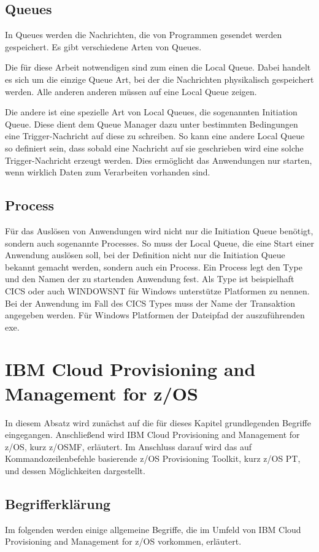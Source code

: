 \subsection{Queues}
In Queues werden die Nachrichten, die von Programmen gesendet werden gespeichert.
Es gibt verschiedene Arten von Queues.

Die für diese Arbeit notwendigen sind zum einen die Local Queue.
Dabei handelt es sich um die einzige Queue Art, bei der die Nachrichten physikalisch gespeichert werden.
Alle anderen anderen müssen auf eine Local Queue zeigen.

Die andere ist eine spezielle Art von Local Queues, die sogenannten Initiation Queue.
Diese dient dem Queue Manager dazu unter bestimmten Bedingungen eine Trigger-Nachricht auf diese zu schreiben.
So kann eine andere Local Queue so definiert sein, dass sobald eine Nachricht auf sie geschrieben wird eine solche Trigger-Nachricht erzeugt werden.
Dies ermöglicht das Anwendungen nur starten, wenn wirklich Daten zum Verarbeiten vorhanden sind.
\cite{Aranha.2013}

\subsection{Process}
Für das Auslösen von Anwendungen wird nicht nur die Initiation Queue benötigt, sondern auch sogenannte Processes.
So muss der Local Queue, die eine Start einer Anwendung auslösen soll, bei der Definition nicht nur die Initiation Queue bekannt gemacht werden, sondern auch ein Process.
Ein Process legt den Type und den Namen der zu startenden Anwendung fest.
Als Type ist beispielhaft CICS oder auch WINDOWSNT für Windows unterstütze Platformen zu nennen.
Bei der Anwendung im Fall des CICS Types muss der Name der Transaktion angegeben werden.
Für Windows Platformen der Dateipfad der auszuführenden exe.
\cite{Aranha.2013}

\section{IBM Cloud Provisioning and Management for z/OS}\label{sec:zosmf}
In diesem Absatz wird zunächst auf die für dieses Kapitel grundlegenden Begriffe eingegangen.
Anschließend wird IBM Cloud Provisioning and Management for z/OS, kurz z/OSMF, erläutert.
Im Anschluss darauf wird das auf Kommandozeilenbefehle basierende z/OS Provisioning Toolkit, kurz z/OS PT, und dessen Möglichkeiten dargestellt.

\subsection{Begrifferklärung}
Im folgenden werden einige allgemeine Begriffe, die im Umfeld von IBM Cloud Provisioning and Management for z/OS vorkommen, erläutert.

